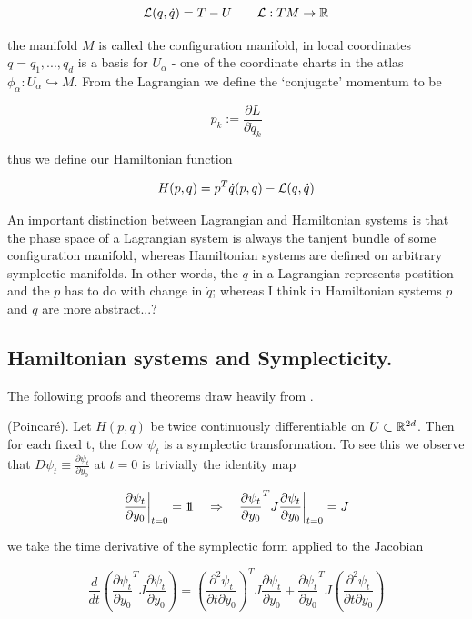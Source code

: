 \documentclass[12pt]{article}
\begin{document}
$$
\mathcal L(q,\dot q) = T - U\qquad \mathcal L : TM \to \mathbb{R}
$$

the manifold $M$ is called the configuration manifold, in local coordinates $q = q_1,...,q_d$ is a basis for $U_\alpha$ - one of the coordinate charts in the atlas $\phi_\alpha : U_\alpha\hookrightarrow M$. From the Lagrangian we define the `conjugate' momentum to be

$$
p_k := \frac{\partial L}{\partial \dot q_k}
$$

thus we define our Hamiltonian function 

$$
H(p,q) = p^T\dot q(p,q) - \mathcal L(q,\dot q)
$$

An important distinction between Lagrangian and Hamiltonian systems is that the phase space of a Lagrangian system is always the tanjent bundle of some configuration manifold, whereas Hamiltonian systems are defined on arbitrary symplectic manifolds. In other words, the $q$ in a Lagrangian represents postition and the $p$ has to do with change in $\dot q$; whereas I think in Hamiltonian systems $p$ and $q$ are more abstract...?


\subsection{Hamiltonian systems and Symplecticity.}

The following proofs and theorems draw heavily from \cite{Numerical}.

 (Poincar\'e). Let $H(p,q)$ be twice continuously differentiable on $U\subset \mathbb{R}^{2d}$. Then for each fixed t, the flow $\psi_t$ is a symplectic transformation. To see this we observe that $D\psi_t \equiv \frac{\partial \psi_t}{\partial y_0}$ at $t=0$ is trivially the identity map

\begin{equation}\label{eq:time flow jacobian at t=0}
\frac{\partial \psi_t}{\partial y_0}\bigg|_{t=0} = 1\!\!1 \quad\Rightarrow\quad \frac{\partial \psi_t}{\partial y_0}^T J \frac{\partial \psi_t}{\partial y_0}\bigg|_{t=0} = J
\end{equation}

we take the time derivative of the symplectic form applied to the Jacobian 

\begin{equation}\label{eq:time derivative of symplectic form applied to jacobian of flow}
    \frac{d}{dt}\left( \frac{\partial \psi_t}{\partial y_0}^T J \frac{\partial \psi_t}{\partial y_0} \right)
    =
    \left( \frac{\partial^2 \psi_t}{\partial t \partial y_0} \right)^T J \frac{\partial \psi_t}{\partial y_0} + \frac{\partial \psi_t}{\partial y_0}^T J \left( \frac{\partial^2 \psi_t}{\partial t \partial y_0} \right)
\end{equation}
\end{document}
